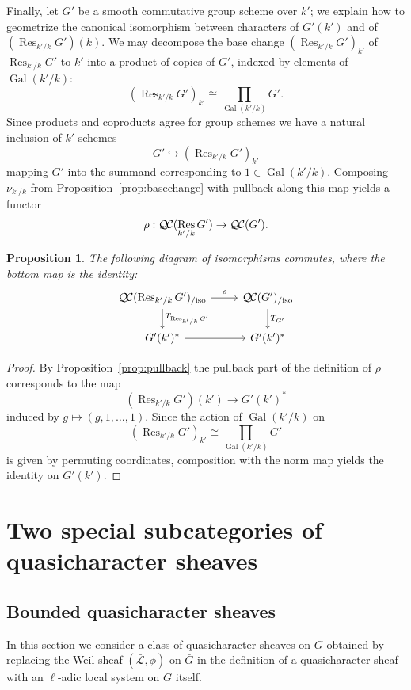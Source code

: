 \documentclass{amsart}
\theoremstyle{plain}
\newtheorem{proposition}[theorem]{Proposition}
\theoremstyle{definition}
\theoremstyle{remark}
\DeclareMathOperator{\Gal}{Gal}
\DeclareMathOperator{\Res}{Res}
\newcommand{\gqcs}[1]{{\mathcal{\bar #1}}}
\newcommand{\QC}{{\mathcal{Q\hskip-0.8pt C}}}
\newcommand{\QCiso}[1]{\QC(#1)_{/\text{iso}}}
\newcommand{\TrFrob}[1]{T_{#1}}
\newcommand{\bG}{\bar{G}}
\begin{document}
Finally, let $G'$ be a smooth commutative group scheme over $k'$;
we explain how to geometrize the canonical isomorphism between characters of $G'(k')$ and of $(\Res_{k'/k}G')(k)$.
We may decompose the base change $(\Res_{k'/k}G')_{k'}$ of $\Res_{k'/k}G'$ to $k'$
into a product of copies of $G'$, indexed by elements of $\Gal(k'/k)$:
\[
(\Res_{k'/k}G')_{k'} \cong \prod_{\Gal(k'/k)} G'.
\]
Since products and coproducts agree for group schemes we have a natural inclusion of $k'$-schemes
\[
G' \hookrightarrow (\Res_{k'/k}G')_{k'}
\]
mapping $G'$ into the summand corresponding to $1 \in \Gal(k'/k)$.  Composing $\nu_{k'/k}$
from Proposition~\ref{prop:basechange} with pullback along this map yields a functor
\[
\rho : \QC(\Res_{k'/k}G') \to \QC(G').
\]

\begin{proposition}
The following diagram of isomorphisms commutes, where the bottom map is the identity:
\[
\begin{tikzcd}
\QCiso{\Res_{k'/k} G'} \dar{\TrFrob{\Res_{k'/k} G'}} \rar{\rho} & \QCiso{G'} \dar{\TrFrob{G'}}\\
G'(k')^* \rar & G'(k')^*
\end{tikzcd}
\]
\end{proposition}
\begin{proof}
By Proposition~\ref{prop:pullback} the pullback part of the definition of $\rho$ corresponds to the map
\[
(\Res_{k'/k}G')(k') \to G'(k')^*
\]
induced by $g \mapsto (g, 1, \ldots, 1)$.  Since the action of $\Gal(k'/k)$ on
\[
(\Res_{k'/k}G')_{k'} \cong \prod_{\Gal(k'/k)} G'
\]
is given by permuting coordinates, composition with the norm map yields the identity on $G'(k')$.
\end{proof}

\section{Two special subcategories of quasicharacter sheaves}%

\subsection{Bounded quasicharacter sheaves}\label{sec:bounded}

In this section we consider a class of quasicharacter sheaves on $G$ obtained by
replacing the Weil sheaf $(\gqcs{L}, \phi)$ on $\bG$ in the definition of a quasicharacter
sheaf with an $\ell$-adic local system on $G$ itself.
\end{document}
